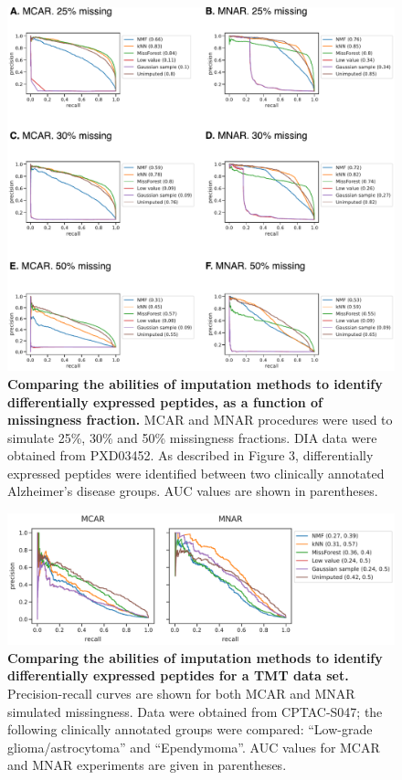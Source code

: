 \documentclass{article}
\begin{document}
\begin{figure}
  \centering
  \includegraphics[width=1.0\textwidth]{figures/differential-expression-DIA-extended-figure.pdf}
  \caption{{\bf Comparing the abilities of imputation methods to identify differentially expressed peptides, as a function of missingness fraction.} MCAR and MNAR procedures were used to simulate 25\%, 30\% and 50\% missingness fractions. DIA data were obtained from PXD03452. As described in Figure 3, differentially expressed peptides were identified between two clinically annotated Alzheimer's disease groups. AUC values are shown in parentheses.}
  \label{fig:DE-extended}
\end{figure}

\begin{figure}
  \centering
  \includegraphics[width=1.0\textwidth]{figures/differential-expression-TMT-figure.pdf}
  \caption{{\bf Comparing the abilities of imputation methods to identify differentially expressed peptides for a TMT data set.} Precision-recall curves are shown for both MCAR and MNAR simulated missingness. Data were obtained from CPTAC-S047; the following clinically annotated groups were compared: ``Low-grade glioma/astrocytoma'' and ``Ependymoma''. AUC values for MCAR and MNAR experiments are given in parentheses.}
  \label{fig:PR-curves-DDA}
\end{figure}
\end{document}
